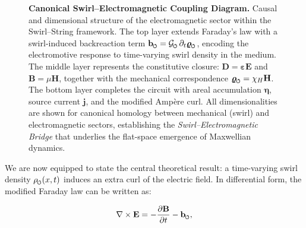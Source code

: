 \documentclass[12pt]{article}
\DeclareRobustCommand{\swirlarrow}{
\mathchoice{\mkern-2mu\scriptstyle\boldsymbol{\circlearrowleft}}%
{\mkern-2mu\scriptstyle\boldsymbol{\circlearrowleft}}%
{\mkern-2mu\scriptscriptstyle\boldsymbol{\circlearrowleft}}%
{\mkern-2mu\scriptscriptstyle\boldsymbol{\circlearrowleft}}
}%
\begin{document}
\begin{figure}[htbp]
{
        }
        \caption{\textbf{Canonical Swirl–Electromagnetic Coupling Diagram.}
        Causal and dimensional structure of the electromagnetic sector within the
        Swirl–String framework.
        The top layer extends Faraday’s law with a swirl-induced backreaction term
            $\mathbf{b}_{\swirlarrow} = \mathcal{G}_{\swirlarrow} \,\partial_t \bm{\varrho}_{\swirlarrow}$,
            encoding the electromotive response to time-varying swirl density in the medium.
            The middle layer represents the constitutive closure:
            $\mathbf{D} = \bm{\varepsilon}\mathbf{E}$ and
            $\mathbf{B} = \mu\mathbf{H}$,
            together with the mechanical correspondence
            $\bm{\varrho}_{\swirlarrow} = \chi_H \mathbf{H}$.
            The bottom layer completes the circuit with areal accumulation
            $\bm{\eta}$, source current $\mathbf{j}$, and the modified Ampère curl.
            All dimensionalities are shown for canonical homology between mechanical
            (swirl) and electromagnetic sectors, establishing the
            \emph{Swirl–Electromagnetic Bridge} that underlies the
            flat-space emergence of Maxwellian dynamics.}

        \label{fig:swirl_em_causal}
    \end{figure}

We are now equipped to state the central theoretical result: a time-varying swirl density $\rho_{\swirlarrow}(x,t)$ induces an extra curl of the electric field. In differential form, the modified Faraday law can be written as:

\begin{equation}\label{eq:faraday-mod}

\nabla \times \mathbf{E} = -\frac{\partial \mathbf{B}}{\partial t} - \mathbf{b}_{\swirlarrow},
\end{equation}
\end{document}

